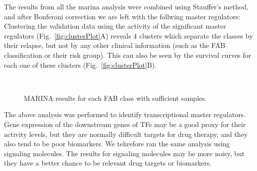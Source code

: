 \documentclass[10pt, letterpaper, twoside, english]{article}
\begin{document}
The results from all the marina analysis were combined using Stauffer's method, 
and after Bonferoni correction we are left with the follwing
master regulators:
Clustering the validation data using the activity of the significant master regulators 
(Fig.~\ref{fig:clusterPlot}A)
reveals 4 clusters which separate the classes by their relapse, 
but not by any other clinical information (such as the FAB classification or their risk group).
This can also be seen by the survival curves for each one of these clusters 
(Fig.~\ref{fig:clusterPlot}B).





\begin{figure}
\begin{center}
\\
\end{center}
\caption{MARINA results for each FAB class with sufficient samples.}
\label{fig:marinaResults}
\end{figure}

The above analysis was performed to identify transcriptional master regulators.
Gene expression of the downstream genes of TFs may be a good proxy for their activity levels, 
but they are normally difficult targets for drug therapy, 
and they also tend to be poor biomarkers.
We tehrefore ran the same analysis using signaling molecules.
The results for signaling molecules may be more noisy, 
but they have a better chance to be relevant drug targets or biomarkers.
\end{document}
